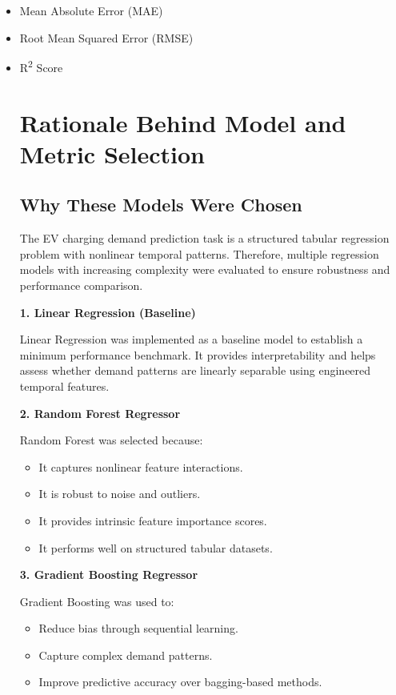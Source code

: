 \documentclass[12pt,a4paper]{article}
\begin{document}
\begin{itemize}
    \item Mean Absolute Error (MAE)
    \item Root Mean Squared Error (RMSE)
    \item R\textsuperscript{2} Score
\section{Rationale Behind Model and Metric Selection}

\subsection{Why These Models Were Chosen}

The EV charging demand prediction task is a structured tabular regression problem with nonlinear temporal patterns. 
Therefore, multiple regression models with increasing complexity were evaluated to ensure robustness and performance comparison.

\textbf{1. Linear Regression (Baseline)}

Linear Regression was implemented as a baseline model to establish a minimum performance benchmark. 
It provides interpretability and helps assess whether demand patterns are linearly separable using engineered temporal features.

\textbf{2. Random Forest Regressor}

Random Forest was selected because:

\begin{itemize}
    \item It captures nonlinear feature interactions.
    \item It is robust to noise and outliers.
    \item It provides intrinsic feature importance scores.
    \item It performs well on structured tabular datasets.
\end{itemize}

\textbf{3. Gradient Boosting Regressor}

Gradient Boosting was used to:

\begin{itemize}
    \item Reduce bias through sequential learning.
    \item Capture complex demand patterns.
    \item Improve predictive accuracy over bagging-based methods.
\end{itemize}


\end{itemize}
\end{document}
